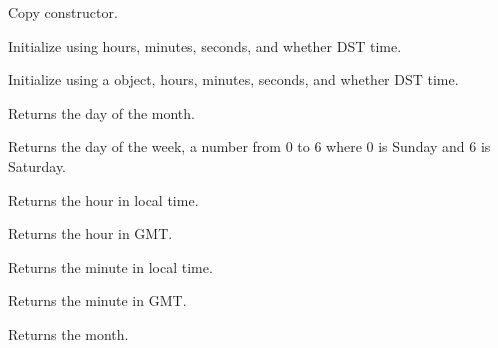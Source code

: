 
Copy constructor.


Initialize using hours, minutes, seconds, and whether DST time.


Initialize using a  object, hours, minutes, seconds, and whether DST time.

\label{wxtimegetday}


Returns the day of the month.

\label{wxtimegetdatofweek}


Returns the day of the week, a number from 0 to 6 where 0 is Sunday and 6 is Saturday.

\label{wxtimegethour}


Returns the hour in local time.

\label{wxtimegethourgmt}


Returns the hour in GMT.

\label{wxtimegetminute}


Returns the minute in local time.

\label{wxtimegetminutegmt}


Returns the minute in GMT.

\label{wxtimegetmonth}


Returns the month.

\label{wxtimegetsecond}

